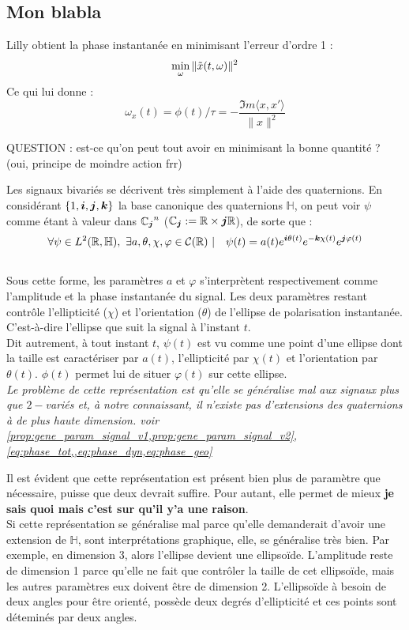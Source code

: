 \subsection{Mon blabla}\label{subsec:blabla}


\begin{enonce}
	Lilly \cite[p. 602/3]{lilly_analysis_2012} obtient la phase instantanée en minimisant l'erreur d'ordre 1 :
	\[\min_{\omega}\|\Tilde{x}(t,\omega)\|^2\]
	Ce qui lui donne :
	\[\omega_x(t) = \phi(t)/\tau = -\frac{\Im m\langle x, x'\rangle}{\|x\|^2}\]
	
	QUESTION : est-ce qu'on peut tout avoir en minimisant la bonne quantité ? (oui, principe de moindre action frr)
\end{enonce}

\begin{proposition}\label{prop:quatern}
Les signaux bivariés se décrivent très simplement à l'aide des quaternions. En considérant $\{1, \bf{i},\bf{j},\bf{k}\}$ la base canonique des quaternions $\mathbb{H}$, on peut voir $\psi$ comme étant à valeur dans ${\C_{\bf{j}}}^n$ ($\C_{\bf{j}} :=\R\times \bf{j}\R$), de sorte que :
\[\forall \psi\in L^2(\R,\mathbb{H}),\ \exists a,\theta,\chi,\varphi \in\mathcal{C}(\R)\ |\quad \psi(t) = a(t)e^{\bf{i}\theta(t)}e^{-\bf{k}\chi(t)}e^{\bf{j}\varphi(t)}\]
\\
Sous cette forme, les paramètres $a$ et $\varphi$ s'interprètent respectivement comme l'amplitude et la phase instantanée du signal. Les deux paramètres restant contrôle l'ellipticité ($\chi$) et l'orientation ($\theta$) de l’ellipse de polarisation instantanée. C'est-à-dire l'ellipse que suit la signal à l'instant $t$.
\\
Dit autrement, à tout instant $t$, $\psi(t)$ est vu comme une point d'une ellipse dont la taille est caractériser par $a(t)$, l'ellipticité par $\chi(t)$ et l'orientation par $\theta(t)$. $\phi(t)$ permet lui de situer $\varphi(t)$ sur cette ellipse.
\\

\textit{Le problème de cette représentation est qu'elle se généralise mal aux signaux plus que $2-$variés et, à notre connaissant, il n'existe pas d'extensions des quaternions à de plus haute dimension. voir \cref{prop:gene_param_signal_v1,prop:gene_param_signal_v2}, \cref{eq:phase_tot,,eq:phase_dyn,eq:phase_geo}} 
\end{proposition}

Il est évident que cette représentation est présent bien plus de paramètre que nécessaire, puisse que deux devrait suffire. Pour autant, elle permet de mieux \textbf{je sais quoi mais c'est sur qu'il y'a une raison}.
\\
Si cette représentation se généralise mal parce qu'elle demanderait d'avoir une extension de $\mathbb{H}$, sont interprétations graphique, elle, se généralise très bien. Par exemple, en dimension 3, alors l'ellipse devient une ellipsoïde. L'amplitude reste de dimension 1 parce qu'elle ne fait que contrôler la taille de cet ellipsoïde, mais les autres paramètres eux doivent être de dimension 2. L'ellipsoïde à besoin de deux angles pour être orienté, possède deux degrés d'ellipticité et ces points sont déteminés par deux angles.
\\


